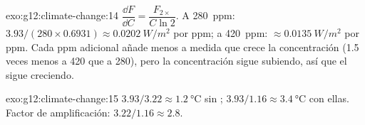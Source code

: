 \begin{solution}{exo:g12:climate-change:14}
$\dfrac{\dd F}{\dd C} = \dfrac{F_{2\times}}{C \ln 2}$. A \qty{280}{ppm}:
$3.93/(280 \times 0.6931) \approx \qty{0.0202}{W/m^2}$ por ppm; a
\qty{420}{ppm}: $\approx \qty{0.0135}{W/m^2}$ por ppm. Cada ppm adicional añade
menos  a medida que crece la concentración (1.5 veces menos a 420 que a 280),
pero la concentración sigue subiendo, así que el  sigue creciendo.
\end{solution}

\begin{solution}{exo:g12:climate-change:15}
$3.93/3.22 \approx \qty{1.2}{\degreeCelsius}$ sin ;
$3.93/1.16 \approx \qty{3.4}{\degreeCelsius}$ con ellas. Factor de
amplificación: $3.22/1.16 \approx 2.8$.
\end{solution}

